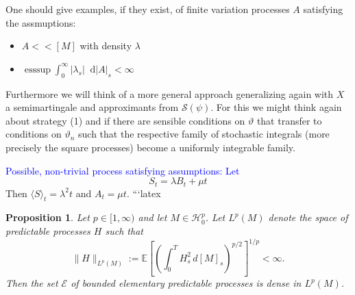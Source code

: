 \documentclass[11pt]{report}
\newcommand{\diff}{\mathop{}\!\mathrm{d}}
\theoremstyle{plain} %
\newtheorem{proposition}[proposition]{Proposition}
\theoremstyle{definition} %
\theoremstyle{remark} %
\begin{document}
One should give examples, if they exist, of finite variation processes \(A\) satisfying the assmuptions:
\begin{itemize}
    \item \(A<<[M]\) with density \(\lambda\)
    \item \(\operatorname*{ess\sup}\int_0^{\infty}|\lambda_s|\diff |A|_s<\infty\)
\end{itemize}

Furthermore we will think of a more general approach generalizing \parencite[Thm.~5.35]{Arandjelovic2025} again with \(X\) a semimartingale and approximants from \(\mathcal{S}(\psi)\). For this we might think again about strategy (1) and if there are sensible conditions on \(\vartheta\) that transfer to conditions on \(\vartheta_n\) such that the respective family of stochastic integrals (more precisely the square processes) become a uniformly integrable family.

\textcolor{blue}{Possible, non-trivial process satisfying assumptions: Let}
\begin{equation}
    S_t = \lambda B_t + \mu t
\end{equation}
Then \(\langle S\rangle_t= \lambda^2 t\) and \(A_t=\mu t\).
\bigbreak
 ```latex
\begin{proposition}
Let \(p \in [1,\infty)\) and let \(M \in \mathcal H^p_0\). Let
\(L^p(M)\) denote the space of predictable processes \(H\) such that
\[
    \|H\|_{L^p(M)}
    :=
    \mathbb E\left[
        \left(
            \int_0^T H_s^2 \, d[M]_s
        \right)^{p/2}
    \right]^{1/p}
    < \infty .
\]
Then the set \(\mathcal E\) of bounded elementary predictable processes is dense in
\(L^p(M)\).
\end{proposition}
\end{document}
